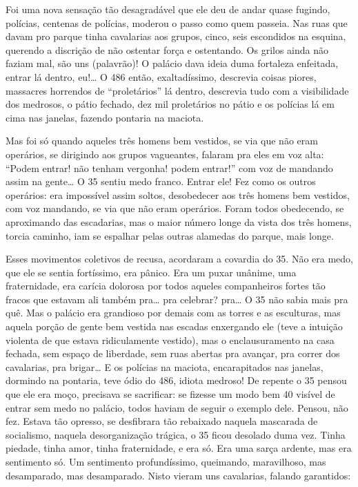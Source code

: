 Foi uma nova sensação tão desagradável que ele deu de andar quase
fugindo, polícias, centenas de polícias, moderou o passo como quem
passeia. Nas ruas que davam pro parque tinha cavalarias aos grupos,
cinco, seis escondidos na esquina, querendo a discrição de não ostentar
força e ostentando. Os grilos ainda não faziam mal, são uns (palavrão)!
O palácio dava ideia duma fortaleza enfeitada, entrar lá dentro, eu!\ldots{}
O 486 então, exaltadíssimo, descrevia coisas piores, massacres horrendos
de ``proletários'' lá dentro, descrevia tudo com a visibilidade dos
medrosos, o pátio fechado, dez mil proletários no pátio e os polícias lá
em cima nas janelas, fazendo pontaria na maciota.

Mas foi só quando aqueles três homens bem vestidos, se via que não eram
operários, se dirigindo aos grupos vagueantes, falaram pra eles em voz
alta: ``Podem entrar! não tenham vergonha! podem entrar!'' com voz de
mandando assim na gente\ldots{} O 35 sentiu medo franco. Entrar ele! Fez como
os outros operários: era impossível assim soltos, desobedecer aos três
homens bem vestidos, com voz mandando, se via que não eram operários.
Foram todos obedecendo, se aproximando das escadarias, mas o maior
número longe da vista dos três homens, torcia caminho, iam se espalhar
pelas outras alamedas do parque, mais longe.

Esses movimentos coletivos de recusa, acordaram a covardia do 35. Não
era medo, que ele se sentia fortíssimo, era pânico. Era um puxar
unânime, uma fraternidade, era carícia dolorosa por todos aqueles
companheiros fortes tão fracos que estavam ali também pra\ldots{} pra
celebrar? pra\ldots{} O 35 não sabia mais pra quê. Mas o palácio era
grandioso por demais com as torres e as esculturas, mas aquela porção de
gente bem vestida nas escadas enxergando ele (teve a intuição violenta
de que estava ridiculamente vestido), mas o enclausuramento na casa
fechada, sem espaço de liberdade, sem ruas abertas pra avançar, pra
correr dos cavalarias, pra brigar\ldots{} E os polícias na maciota,
encarapitados nas janelas, dormindo na pontaria, teve ódio do 486,
idiota medroso! De repente o 35 pensou que ele era moço, precisava se
sacrificar: se fizesse um modo bem 40 visível de entrar sem medo no
palácio, todos haviam de seguir o exemplo dele. Pensou, não fez. Estava
tão opresso, se desfibrara tão rebaixado naquela mascarada de
socialismo, naquela desorganização trágica, o 35 ficou desolado duma
vez. Tinha piedade, tinha amor, tinha fraternidade, e era só. Era uma
sarça ardente, mas era sentimento só. Um sentimento profundíssimo,
queimando, maravilhoso, mas desamparado, mas desamparado. Nisto vieram
uns cavalarias, falando garantidos:

